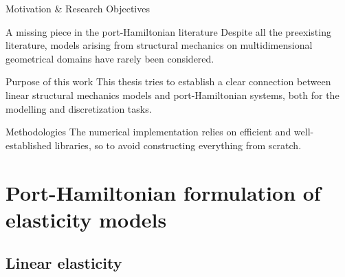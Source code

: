 \documentclass[aspectratio=169]{ISAE-Beamer}
\begin{document}
{\begin{overlayarea}{\textwidth}{\textheight}
\end{overlayarea}
}

\begin{frame}{Motivation \& Research Objectives}

\begin{alertblock}{A missing piece in the port-Hamiltonian literature}
Despite all the preexisting literature, models arising from structural mechanics on multidimensional geometrical domains have rarely been considered. 
\end{alertblock}

\begin{block}{Purpose of this work}
This thesis tries to establish a clear connection between linear structural mechanics models
and port-Hamiltonian systems, both for the modelling and discretization tasks.
\end{block}

\begin{exampleblock}{Methodologies}
The numerical implementation relies on efficient and well-established libraries, so to avoid constructing everything from scratch.
\end{exampleblock}

\end{frame}


\section{Port-Hamiltonian formulation of elasticity models}

\subsection{Linear elasticity}
\end{document}
